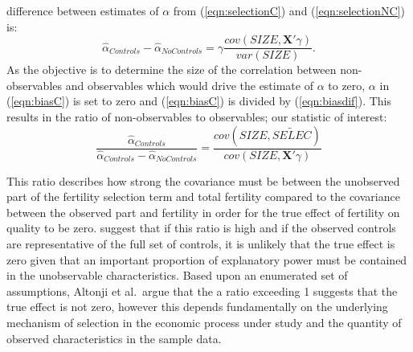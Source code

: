 \documentclass{article}[11pt,subeqn]
\newcommand{\vect}[1]{\mathbf{#1}}
\begin{document}
\begin{spacing}{1.5}
difference between estimates of $\alpha$ from (\ref{eqn:selectionC}) and (\ref{eqn:selectionNC}) is:
\begin{equation}
 \label{eqn:biasdif}
\hat\alpha_{Controls} - \hat\alpha_{NoControls} = \gamma\frac{cov(SIZE,\vect{X}'\gamma)}{var(SIZE)}.
\end{equation}
As the objective is to determine the size of the correlation between non-observables and observables which would drive the estimate of $\alpha$ to zero, $\alpha$ in (\ref{eqn:biasC})
is set to zero and (\ref{eqn:biasC}) is divided by (\ref{eqn:biasdif}).  This results in the ratio of non-observables to observables; our statistic of interest:
\begin{equation}
 \label{eqn:Aratio}
\frac{\hat\alpha_{Controls}}{\hat\alpha_{Controls} - \hat\alpha_{NoControls}}=\frac{cov(SIZE,\widetilde{SELEC})}{cov(SIZE,\vect{X}'\gamma)}
\end{equation}

This ratio describes how strong the covariance must be between the unobserved part of the fertility selection term and total fertility compared to the covariance between the observed
part and fertility in order for the true effect of fertility on quality to be zero.  \citet{Altonjietal2005} suggest that if this ratio is high and if the observed controls are
representative of the full set of controls, it is unlikely that the true effect is zero given that an important proportion of explanatory power must be contained in the unobservable 
characteristics.  Based upon an enumerated set of assumptions, Altonji et al.\ argue that the a ratio exceeding 1 suggests that the true effect is not zero, however this depends 
fundamentally on the underlying mechanism of selection in the economic process under study and the quantity of observed characteristics in the sample data.


\end{spacing}
\end{document}
